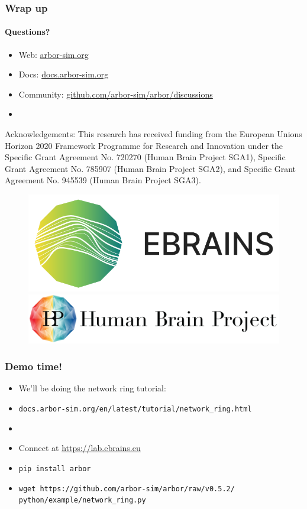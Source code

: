 \documentclass[t]{beamer}
\begin{document}
\begin{frame}
    \frametitle{Wrap up}
    \framesubtitle{Questions?}
    \begin{itemize}
        \item Web: \url{arbor-sim.org}
        \item Docs: \url{docs.arbor-sim.org}
        \item Community: \url{github.com/arbor-sim/arbor/discussions}
        \item[]
    \end{itemize}

    { \scriptsize Acknowledgements: This research has received funding from the European Unions
    Horizon 2020 Framework Programme for Research and
    Innovation under the Specific Grant Agreement No. 720270
    (Human Brain Project SGA1), Specific Grant Agreement No.
    785907 (Human Brain Project SGA2), and Specific Grant
    Agreement No. 945539 (Human Brain Project SGA3). }
    \newline
    \begin{figure}[h]
        \begin{center}
            \includegraphics[width=0.2\linewidth]{ebrains_logo.png}
            \hspace{2em}
            \includegraphics[width=0.4\linewidth]{HBP_logo.jpg}
        \end{center}
    \end{figure}
\end{frame}

\begin{frame}
    \frametitle{Demo time!}
    \begin{itemize}
    \item We'll be doing the network ring tutorial:
    \item[] \texttt{docs.arbor-sim.org/en/latest/tutorial/network\_ring.html}
    \item[]
    \item Connect at \url{https://lab.ebrains.eu}
    \item \texttt{pip install arbor}
    \item \texttt{wget https://github.com/arbor-sim/arbor/raw/v0.5.2/ python/example/network\_ring.py}
    \end{itemize}
\end{frame}
\end{document}
